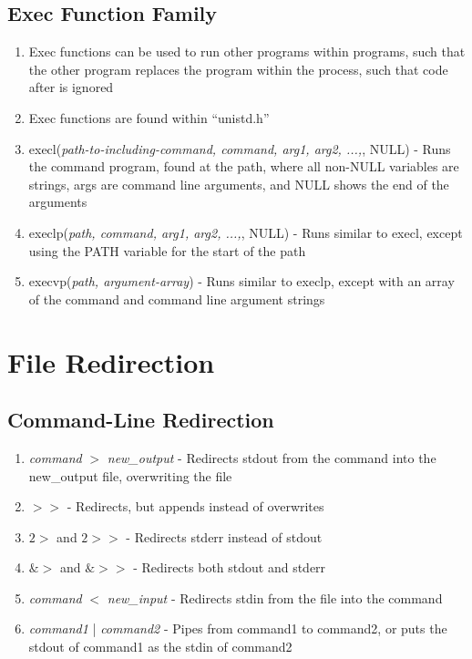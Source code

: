 \documentclass[11 pt, twoside]{article}
\begin{document}
\subsection{Exec Function Family}
\begin{enumerate}
\item Exec functions can be used to run other programs within programs, such that the other program replaces the program within the process, such that code after is ignored
\item Exec functions are found within ``unistd.h''
\item execl(\textit{path-to-including-command, command, arg1, arg2, ...,}, NULL) - Runs the command program, found at the path,  where all non-NULL variables are strings, args are command line arguments, and NULL shows the end of the arguments
\item execlp(\textit{path, command, arg1, arg2, ...,}, NULL) - Runs similar to execl, except using the PATH variable for the start of the path
\item execvp(\textit{path, argument-array}) - Runs similar to execlp, except with an array of the command and command line argument strings
\end{enumerate}

\section{File Redirection}

\subsection{Command-Line Redirection}
\begin{enumerate}
\item \textit{command} $>$ \textit{new\_output} - Redirects stdout from the command into the new\_output file, overwriting the file
\item $>>$ - Redirects, but appends instead of overwrites
\item $2>$ and $2>>$ - Redirects stderr instead of stdout
\item $\&>$ and $\&>>$ - Redirects both stdout and stderr 
\item \textit{command} $<$ \textit{new\_input} - Redirects stdin from the file into the command
\item \textit{command1} | \textit{command2} - Pipes from command1 to command2, or puts the stdout of command1 as the stdin of command2
\end{enumerate}
\end{document}
